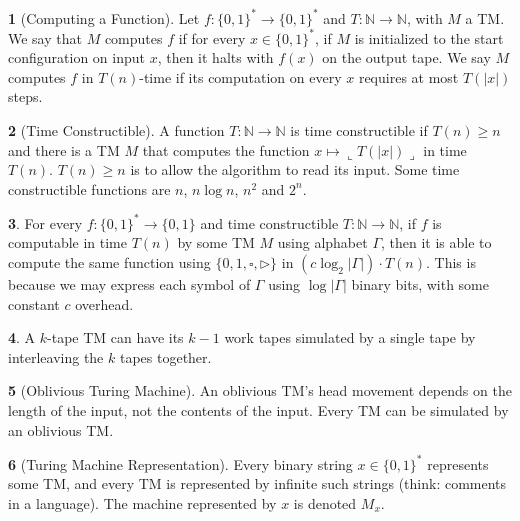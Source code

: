 \documentclass[10pt]{article}
\theoremstyle{definition}
\newtheorem{note}{}[section]
\begin{document}
\begin{note}[Computing a Function]
  Let $f : \{0, 1\}^\ast \to \{0, 1\}^\ast$ and
  $T : \mathbb{N} \to \mathbb{N}$, with $M$ a TM.
  We say that $M$ computes $f$ if for every $x \in \{0, 1\}^\ast$, if
  $M$ is initialized to the start configuration on input $x$, then it halts
  with $f(x)$ on the output tape.
  We say $M$ computes $f$ in $T(n)$-time if its computation on every
  $x$ requires at most $T(|x|)$ steps.
\end{note}

\begin{note}[Time Constructible]
  A function $T: \mathbb{N} \to \mathbb{N}$ is time constructible if
  $T(n) \geq n$ and there is a TM $M$ that computes the function
  $x \mapsto \llcorner T(|x|) \lrcorner$ in time $T(n)$.
  $T(n) \geq n$ is to allow the algorithm to read its input.
  Some time constructible functions are $n$, $n \log n$, $n^2$ and $2^n$.
\end{note}

\begin{note}
  For every $f : \{0, 1\}^\ast \to \{0, 1\}$ and time constructible
  $T : \mathbb{N} \to \mathbb{N}$, if $f$ is computable in time $T(n)$ by
  some TM $M$ using alphabet $\Gamma$, then it is able to compute the same
  function using $\{0, 1, \square, \triangleright\}$ in 
  $\left(c \log_2 | \Gamma| \right) \cdot T(n)$.
  This is because we may express each symbol of $\Gamma$ using
  $\log |\Gamma|$ binary bits, with some constant $c$ overhead.
\end{note}

\begin{note}
  A $k$-tape TM can have its $k - 1$ work tapes simulated by a single tape by
  interleaving the $k$ tapes together.
\end{note}

\begin{note}[Oblivious Turing Machine]
  An oblivious TM's head movement depends on the length of the input, not
  the contents of the input.
  Every TM can be simulated by an oblivious TM.
\end{note}

\begin{note}[Turing Machine Representation]
  Every binary string $x \in \{0, 1\}^\ast$ represents some TM, and every TM
  is represented by infinite such strings (think: comments in a language).
  The machine represented by $x$ is denoted $M_x$.
\end{note}
\end{document}
